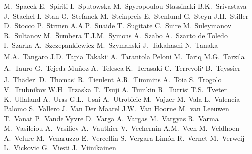 \begin{flushleft}
M.~Spacek\And
E.~Spiriti\And
I.~Sputowska\And
M.~Spyropoulou-Stassinaki\And
B.K.~Srivastava\And
J.~Stachel\And
I.~Stan\And
G.~Stefanek\And
M.~Steinpreis\And
E.~Stenlund\And
G.~Steyn\And
J.H.~Stiller\And
D.~Stocco\And
P.~Strmen\And
A.A.P.~Suaide\And
T.~Sugitate\And
C.~Suire\And
M.~Suleymanov\And
R.~Sultanov\And
M.~\v{S}umbera\And
T.J.M.~Symons\And
A.~Szabo\And
A.~Szanto de Toledo\And
I.~Szarka\And
A.~Szczepankiewicz\And
M.~Szymanski\And
J.~Takahashi\And
N.~Tanaka\And
M.A.~Tangaro\And
J.D.~Tapia Takaki\textsuperscript{,}\And
A.~Tarantola Peloni\And
M.~Tariq\And
M.G.~Tarzila\And
A.~Tauro\And
G.~Tejeda Mu\~{n}oz\And
A.~Telesca\And
K.~Terasaki\And
C.~Terrevoli\textsuperscript{,}\And
B.~Teyssier\And
J.~Th\"{a}der\textsuperscript{,}\And
D.~Thomas\textsuperscript{,}\And
R.~Tieulent\And
A.R.~Timmins\And
A.~Toia\And
S.~Trogolo\And
V.~Trubnikov\And
W.H.~Trzaska\And
T.~Tsuji\And
A.~Tumkin\And
R.~Turrisi\And
T.S.~Tveter\And
K.~Ullaland\And
A.~Uras\And
G.L.~Usai\And
A.~Utrobicic\And
M.~Vajzer\And
M.~Vala\And
L.~Valencia Palomo\And
S.~Vallero\And
J.~Van Der Maarel\And
J.W.~Van Hoorne\And
M.~van Leeuwen\And
T.~Vanat\And
P.~Vande Vyvre\And
D.~Varga\And
A.~Vargas\And
M.~Vargyas\And
R.~Varma\And
M.~Vasileiou\And
A.~Vasiliev\And
A.~Vauthier\And
V.~Vechernin\And
A.M.~Veen\And
M.~Veldhoen\And
A.~Velure\And
M.~Venaruzzo\And
E.~Vercellin\And
S.~Vergara Lim\'on\And
R.~Vernet\And
M.~Verweij\And
L.~Vickovic\And
G.~Viesti\And
J.~Viinikainen\And

\end{flushleft}
